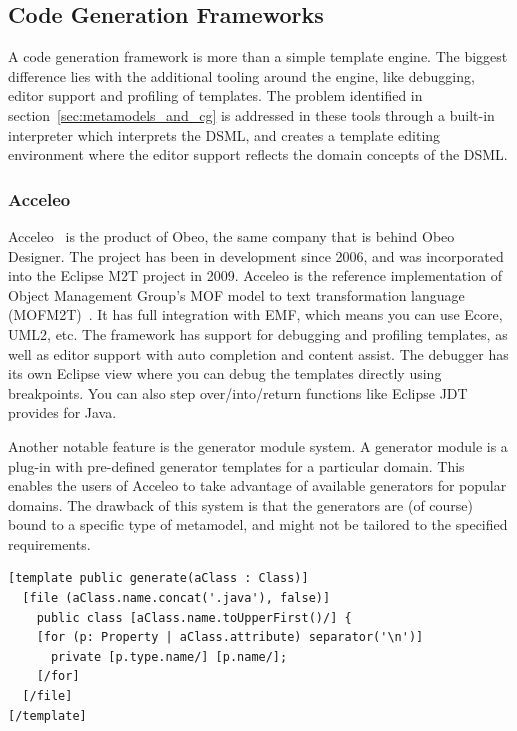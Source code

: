 \subsection{Code Generation Frameworks}
A code generation framework is more than a simple template engine. The biggest difference lies with the additional tooling around the engine, like debugging, editor support and profiling of templates. The problem identified in section~\ref{sec:metamodels_and_cg} is addressed in these tools through a built-in interpreter which interprets the DSML, and creates a template editing environment where the editor support reflects the domain concepts of the DSML.

\subsubsection{Acceleo}\label{subsec:acceleo}
Acceleo~\cite{acceleo} is the product of Obeo, the same company that is behind Obeo Designer. The project has been in development 
since 2006, and was incorporated into the Eclipse M2T project in 2009. Acceleo is the reference implementation of 
Object Management Group's MOF model to text transformation language (MOFM2T)~\cite{MOFM2T}. It has full integration with EMF, 
which means you can use Ecore, UML2, etc. The framework has support for debugging and profiling templates, as well 
as editor support with auto completion and content assist. The debugger has its own Eclipse view where you can debug the templates directly using breakpoints. You can also step over/into/return functions like Eclipse JDT provides for Java. 

Another notable feature is the generator module system. A generator module is a plug-in with pre-defined generator templates for a particular domain. This enables the users of Acceleo to take advantage of available generators for popular domains. The drawback of this system is that the generators are (of course) bound to a specific type of metamodel, and might not be tailored to the specified requirements.

\lstset{caption=Example showing the MOFM2T language used in Acceleo,label=list:acceleoexample,captionpos=b}
\begin{table}[ht]
  \centering
\begin{lstlisting}[showstringspaces=false]
[template public generate(aClass : Class)]
  [file (aClass.name.concat('.java'), false)]
    public class [aClass.name.toUpperFirst()/] {
    [for (p: Property | aClass.attribute) separator('\n')]
      private [p.type.name/] [p.name/];
    [/for]
  [/file]
[/template]
\end{lstlisting}
\end{table}

